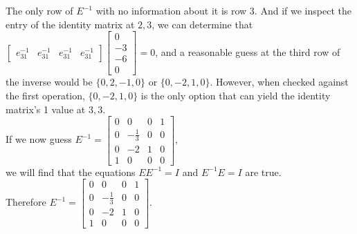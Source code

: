 \documentclass[fleqn]{article}
\begin{document}
The only row of $E^{-1}$ with no information about it is row 3.  And if we inspect the entry of the identity matrix at $2,3$, we can determine that $\begin{bmatrix}e^{-1}_{31}&e^{-1}_{31}& e^{-1}_{31}& e^{-1}_{31}\end{bmatrix}\begin{bmatrix}0\\-3\\-6\\0\end{bmatrix} = 0$, and a reasonable guess at the third row of the inverse would be $\{0,2,-1,0\}$ or $\{0,-2,1,0\}$.  However, when checked against the first operation, $\{0,-2,1,0\}$ is the only option that can yield the identity matrix's 1 value at $3,3$.\\

\noindent If we now guess $E^{-1} = \begin{bmatrix}0&0&0&1\\0&-\frac{1}{3}&0&0\\0&-2&1&0\\1&0&0&0\end{bmatrix}$,\\ 
we will find that the equations $EE^{-1} = I$ and $E^{-1}E = I$ are true.\\

\noindent Therefore $E^{-1}=\begin{bmatrix}0&0&0&1\\0&-\frac{1}{3}&0&0\\0&-2&1&0\\1&0&0&0\end{bmatrix}$.
\end{document}
